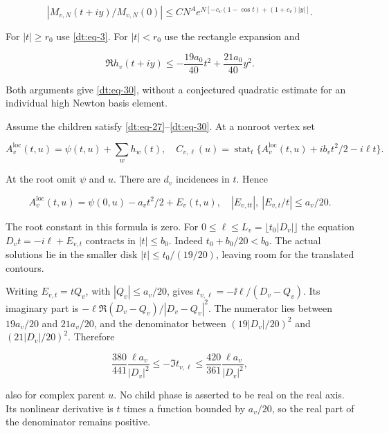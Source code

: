 \begin{equation}\label{dt:eq-31}
|M_{v,N}(t+iy)/M_{v,N}(0)|
 \le CN^A e^{N[-c_v(1-\cos t)+(1+c_v)|y|]}.
\end{equation}

For \(|t|\ge r_0\) use \eqref{dt:eq-3}. For \(|t|<r_0\) use the rectangle expansion and

\begin{equation}\label{dt:eq-32}
\Re h_v(t+iy)\le
       -\frac{19a_0}{40}t^2+\frac{21a_0}{40}y^2.
\end{equation}

Both arguments give \eqref{dt:eq-30}, without a conjectured quadratic estimate for
an individual high Newton basis element.

Assume the children satisfy \eqref{dt:eq-27}--\eqref{dt:eq-30}. At a nonroot vertex set

\begin{equation}\label{dt:eq-33}
A_v^{\mathrm{loc}}(t,u)=\psi(t,u)+\sum_wh_w(t),
 \quad
 C_{v,\ell}(u)=\operatorname{stat}_t
       \{A_v^{\mathrm{loc}}(t,u)+ib_vt^2/2-i\ell t\}.
\end{equation}

At the root omit \(\psi\) and \(u\). There are \(d_v\) incidences in \(t\). Hence

\begin{equation}\label{dt:eq-34}
A_v^{\mathrm{loc}}(t,u)=\psi(0,u)-a_vt^2/2+E_v(t,u),
       \quad |E_{v,tt}|,\ |E_{v,t}/t|\le a_v/20.
\end{equation}

The root constant in this formula is zero. For \(0\le\ell\le L_v=\lfloor t_0|D_v|\rfloor\)
the equation \(D_vt=-i\ell+E_{v,t}\) contracts in \(|t|\le b_0\). Indeed
\(t_0+b_0/20<b_0\). The actual solutions lie in the smaller disk
\(|t|\le t_0/(19/20)\), leaving room for the translated contours.

Writing \(E_{v,t}=tQ_v\), with \(|Q_v|\le a_v/20\), gives
\(t_{v,\ell}=-\ii\ell/(D_v-Q_v)\). Its imaginary part is
\(-\ell\Re(D_v-Q_v)/|D_v-Q_v|^2\). The numerator lies
between \(19a_v/20\) and \(21a_v/20\), and the denominator
between \((19|D_v|/20)^2\) and \((21|D_v|/20)^2\).
Therefore

\begin{equation}\label{dt:eq-35}
\frac{380}{441}\frac{\ell a_v}{|D_v|^2}
 \le-\Im t_{v,\ell}\le
 \frac{420}{361}\frac{\ell a_v}{|D_v|^2},
\end{equation}

also for complex parent \(u\). No child phase is asserted to be real on
the real axis. Its nonlinear derivative is \(t\) times a function bounded
by \(a_v/20\), so the real part of the denominator remains positive.

